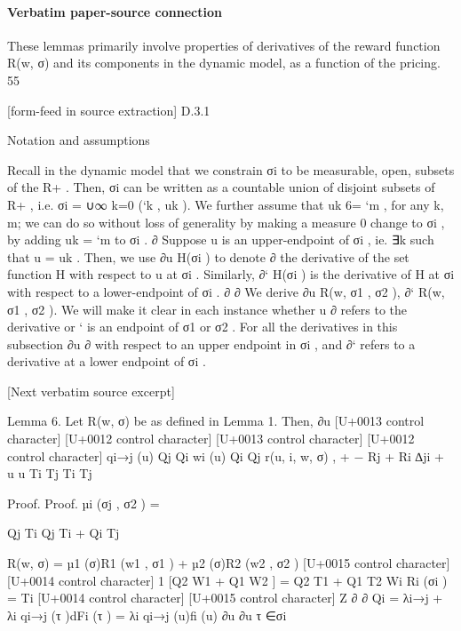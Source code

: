 \documentclass[10pt]{article}
\begin{document}
\paragraph{Verbatim paper-source connection}
\begin{ReviewVerbatim}
These lemmas primarily involve properties of derivatives of the reward function R(w, σ) and its
components in the dynamic model, as a function of the pricing.
55


[form-feed in source extraction]
D.3.1

Notation and assumptions

Recall in the dynamic model that we constrain σi to be measurable, open, subsets of the R+ . Then,
σi can be written as a countable union of disjoint subsets of R+ , i.e. σi = ∪∞
k=0 (`k , uk ). We further
assume that uk 6= `m , for any k, m; we can do so without loss of generality by making a measure 0
change to σi , by adding uk = `m to σi .
∂
Suppose u is an upper-endpoint of σi , ie. ∃k such that u = uk . Then, we use ∂u
H(σi ) to denote
∂
the derivative of the set function H with respect to u at σi . Similarly, ∂` H(σi ) is the derivative of
H at σi with respect to a lower-endpoint of σi .
∂
∂
We derive ∂u
R(w, {σ1 , σ2 }), ∂`
R(w, {σ1 , σ2 }). We will make it clear in each instance whether u
∂
refers to the derivative
or ` is an endpoint of σ1 or σ2 . For all the derivatives in this subsection ∂u
∂
with respect to an upper endpoint in σi , and ∂` refers to a derivative at a lower endpoint of σi .

[Next verbatim source excerpt]

Lemma 6. Let R(w, σ) be as defined in Lemma 1. Then, ∂u
[U+0013 control character]
[U+0012 control character]
[U+0013 control character] [U+0012 control character]
qi→j (u)
Qj
Qi
wi (u) Qi Qj
r(u, i, w, σ) ,
+
−
Rj +
Ri
∆ji +
u
u
Ti
Tj
Ti
Tj

Proof. Proof.
µi ({σj , σ2 }) =

Qj Ti
Qj Ti + Qi Tj

R(w, σ) = µ1 (σ)R1 (w1 , σ1 ) + µ2 (σ)R2 (w2 , σ2 )
[U+0015 control character]
[U+0014 control character]
1
[Q2 W1 + Q1 W2 ]
=
Q2 T1 + Q1 T2
Wi
Ri (σi ) =
Ti
[U+0014 control character]
[U+0015 control character]
Z
∂
∂
Qi =
λi→j + λi
qi→j (τ )dFi (τ ) = λi qi→j (u)fi (u)
∂u
∂u
τ ∈σi
\end{ReviewVerbatim}
\end{document}
